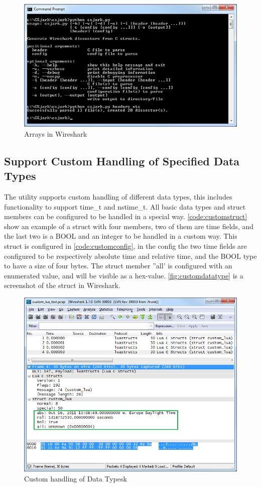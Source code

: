 \begin{figure}[ht]
	\center
	\includegraphics[width=\textwidth]{./sprints/img/csjark_folder}
	\caption{Arrays in Wireshark\label{fig:csjarkfolder}}
\end{figure}

\subsection{Support Custom Handling of Specified Data Types}
The utility supports custom handling of different data types, this includes 
functionality to support  time\_t and nstime\_t. All basic data types and 
struct members can be configured to be handled in a special way. 
\autoref{code:customstruct} show an example of a struct with four members, two 
of them are time fields, and the last two is a BOOL and an integer to be 
handled in a custom way. This struct is configured in 
\autoref{code:customconfig}, in the config the two time fields are configured 
to be respectively absolute time and relative time, and the BOOL type to have 
a size of four bytes. The struct member ''all' is configured with an enumerated 
value, and will be visible as a hex-value. \autoref{fig:customdatatype} is a 
screenshot of the struct in Wireshark.

\begin{figure}[ht]
	\center
	\includegraphics[width=\textwidth]{./sprints/img/wireshark_custom}
	\caption{Custom handling of Data Typesk\label{fig:customdatatype}}
\end{figure}

